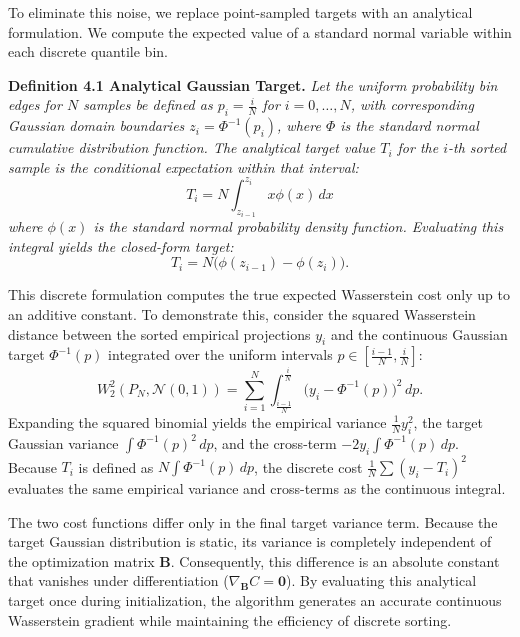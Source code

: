 \documentclass[12pt,a4paper,twoside,openany]{book}
\begin{document}
To eliminate this noise, we replace point-sampled targets with an analytical formulation. 
We compute the expected value of a standard normal variable within each discrete quantile bin.

\vspace{0.5em}
\noindent\textbf{Definition 4.1 Analytical Gaussian Target.} \textit{Let the uniform probability bin edges for $N$ samples be 
defined as $p_i = \frac{i}{N}$ for $i = 0, \dots, N$, with corresponding Gaussian domain boundaries $z_i = \Phi^{-1}(p_i)$, where $\Phi$ is 
the standard normal cumulative distribution function. The analytical target value $T_i$ for the $i$-th sorted 
sample is the conditional expectation within that interval:}
\begin{equation}
    T_i = N \int_{z_{i-1}}^{z_i} x \phi(x) \, dx
\end{equation}
\textit{where $\phi(x)$ is the standard normal probability density function. Evaluating this integral yields the closed-form target:}
\begin{equation}
    T_i = N \big( \phi(z_{i-1}) - \phi(z_i) \big).
\end{equation}
\vspace{0.5em}

This discrete formulation computes the true expected Wasserstein cost only up to an additive constant. 
To demonstrate this, consider the squared Wasserstein distance between the sorted empirical projections $y_i$ and 
the continuous Gaussian target $\Phi^{-1}(p)$ integrated over the uniform intervals $p \in [\frac{i-1}{N}, \frac{i}{N}]$:
\begin{equation}
    W_2^2(P_N, \mathcal{N}(0,1)) = \sum_{i=1}^N \int_{\frac{i-1}{N}}^{\frac{i}{N}} \big( y_i - \Phi^{-1}(p) \big)^2 \, dp.
\end{equation}
Expanding the squared binomial yields the empirical variance $\frac{1}{N}y_i^2$, the target Gaussian variance $\int \Phi^{-1}(p)^2 \, dp$, 
and the cross-term $-2y_i \int \Phi^{-1}(p) \, dp$. Because $T_i$ is defined as $N \int \Phi^{-1}(p) \, dp$, 
the discrete cost $\frac{1}{N}\sum (y_i - T_i)^2$ evaluates the same empirical variance and cross-terms as the continuous integral. 

The two cost functions differ only in the final target variance term. Because the target Gaussian distribution is static, 
its variance is completely independent of the optimization matrix $\mathbf{B}$. Consequently, this difference is an absolute constant 
that vanishes under differentiation ($\nabla_{\mathbf{B}} C = \mathbf{0}$). By evaluating this analytical target once during initialization, 
the algorithm generates an accurate continuous Wasserstein gradient while maintaining the efficiency of discrete sorting.
\end{document}

